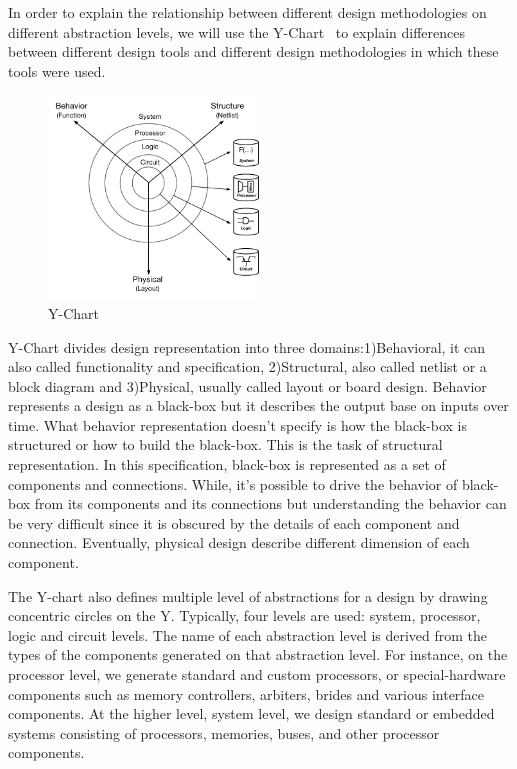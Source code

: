 In order to explain the relationship between different design methodologies on
different abstraction levels, we will use the Y-Chart~\cite{walker_1985_y_model} to explain differences between different design tools and different design methodologies in which these tools were used.

\begin{figure}[h]
    \centering
    \includegraphics[width=0.5\textwidth]{figures/Introduction/Y-chart.pdf}
    \caption{Y-Chart}
    \label{fig:y-chart}
\end{figure}

Y-Chart divides design representation into three domains:1)Behavioral, it can also called functionality and specification, 2)Structural, also called netlist or a block diagram and 3)Physical, usually called layout or board design. Behavior represents a design as a black-box but it describes the output base on inputs over time. What behavior representation doesn't specify is how the black-box is structured or how to build the black-box. This is the task of structural representation. In this specification, black-box is represented as a set of components and connections. While, it's possible to drive the behavior of black-box from its components and its connections but understanding the behavior can be very difficult since it is obscured by the details of each component and connection.
Eventually, physical design describe different dimension of each component.

The Y-chart also defines multiple level of abstractions for a design by drawing concentric circles on the Y. Typically, four levels are used: system, processor, logic and circuit levels.
The name of each abstraction level is derived from the types of the components generated on that abstraction level.
For instance, on the processor level, we generate standard and custom processors, or special-hardware components such as memory controllers, arbiters, brides and various interface components. At the higher level, system level, we design standard or embedded systems consisting of processors, memories, buses, and other processor components.

